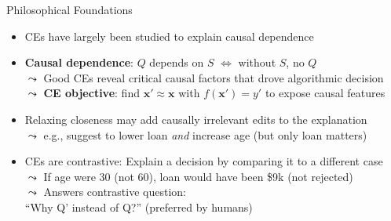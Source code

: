 \documentclass[10pt,compress,t,notes=noshow, xcolor=table]{beamer}
\begin{document}
\begin{frame}{Philosophical Foundations}
  \begin{itemize}%
    \item<1-> CEs have largely been studied to explain causal dependence
    \item<1-> \textbf{Causal dependence}: $Q$ depends on $S$   $\Leftrightarrow$ without $S$, no $Q$\\
    $\leadsto$ Good CEs reveal critical causal factors that drove algorithmic decision\\
    $\leadsto$ \textbf{CE objective}: find $\mathbf{x}' \!\approx\! \mathbf{x}$ with $f(\mathbf{x}')=y'$ to expose causal features
    \item<2-> Relaxing closeness may add causally irrelevant edits to the explanation\\
$\leadsto$ e.g., suggest to lower loan \emph{and} increase age (but only loan matters)

\item<3-> CEs are contrastive: Explain a decision by comparing it to a different case\\
$\leadsto$ If age were 30 (not 60), loan would have been \$9k (not rejected)\\%
$\leadsto$ Answers contrastive question: \\``Why Q' instead of Q?'' (preferred by humans)

  \end{itemize}
\end{frame}















\end{document}
